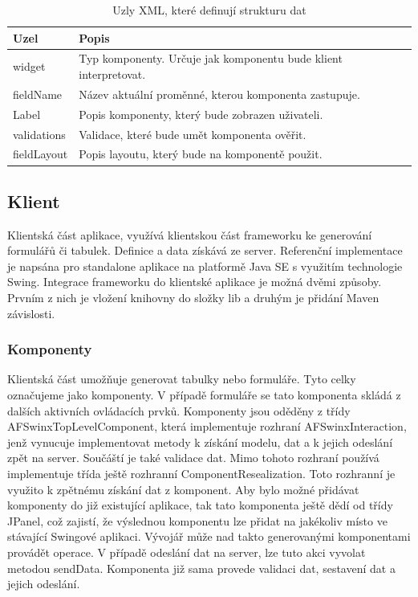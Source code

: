 \begin{table}[width=\linewidth]
\begin{center}
\caption{Uzly XML, které definují strukturu dat}
\label{table:xmlComponentAttributes}
\begin{tabular}{|p{7cm}|p{7cm}|}
\hline
\textbf{Uzel} & \textbf{Popis} \\
\hline
widget & 
Typ komponenty. Určuje jak komponentu bude klient interpretovat.\\
\hline
fieldName &
Název aktuální proměnné, kterou komponenta zastupuje.\\
\hline
Label &
Popis komponenty, který bude zobrazen uživateli. \\
\hline
validations &
Validace, které bude umět komponenta ověřit. \\
\hline
fieldLayout&
Popis layoutu, který bude na komponentě použit. \\
\hline
\end{tabular}
\end{center}
\end{table}


\subsection{Klient}
Klientská část aplikace, využívá klientskou část frameworku ke generování formulářů či tabulek. Definice a data získává ze server. Referenční implementace je napsána pro standalone aplikace na platformě Java SE s využitím technologie Swing. Integrace frameworku do klientské aplikace je možná dvěmi způsoby. Prvním z nich je vložení knihovny do složky lib a druhým je přidání Maven závislosti. 
\subsubsection{Komponenty}
Klientská část umožňuje generovat tabulky nebo formuláře. Tyto celky označujeme jako komponenty. V případě formuláře se tato komponenta skládá z dalších aktivních ovládacích prvků. Komponenty jsou oděděny z třídy AFSwinxTopLevelComponent, která implementuje rozhraní AFSwinxInteraction, jenž vynucuje implementovat metody k získání modelu, dat a k jejich odeslání zpět na server. Součáští je také validace dat. Mimo tohoto rozhraní používá implementuje třída ještě rozhranní ComponentResealization. Toto rozhranní je využito k zpětnému získání dat z komponent. Aby bylo možné přidávat komponenty do již existující aplikace, tak tato komponenta ještě dědí od třídy JPanel, což zajistí, že výslednou komponentu lze přidat na jakékoliv místo ve stávající Swingové aplikaci. Vývojář může nad takto generovanými komponentami provádět operace. V případě odeslání dat na server, lze tuto akci vyvolat metodou sendData. Komponenta již sama provede validaci dat, sestavení dat a jejich odeslání.

